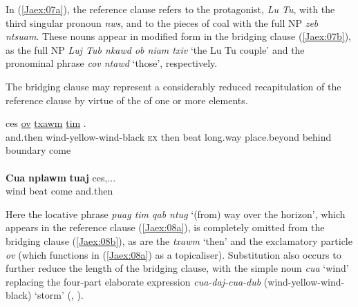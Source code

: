 \documentclass[output=paper]{LSP/langsci}
\begin{document}
\noindent
In (\ref{Jaex:07a}), the reference clause refers to the protagonist, \textit{Lu Tu}, with the third singular pronoun \textit{nws}, and to the pieces of coal with the full NP \textit{zeb ntsuam}. These nouns appear in modified form in the bridging clause (\ref{Jaex:07b}), as the full NP \textit{Luj Tub nkawd ob niam txiv } `the Lu Tu couple' and the pronominal phrase \textit{cov ntawd } `those', respectively. 


The bridging clause may represent a considerably reduced recapitulation of the reference clause by virtue of the  of one or more elements.

%
\begin{exe}
\ex \label{Jaex:08ab}
\begin{xlist}
\ex \label{Jaex:08a}
\gll ces  \underline{} \underline{ov} \underline{txawm} \underline{} \underline{} \underline{tim} \underline{} \underline{} \underline{}.\\
and.then wind-yellow-wind-black \textsc{ex} then beat long.way place.beyond behind boundary come \\
\glt {}\\
\ex \label{Jaex:08b}
\gll \textbf{Cua}  \textbf{nplawm}  \textbf{tuaj} ces,...\\     	      
     wind  beat   come  and.then\\
\glt {} \citep[][4]{johnson92}
\end{xlist}
\end{exe}

\noindent
Here the locative phrase \textit{puag tim qab ntug } `(from) way over the horizon', which appears in the reference clause (\ref{Jaex:08a}), is completely omitted from the bridging clause (\ref{Jaex:08b}), as are the   \textit{txawm } `then' and the exclamatory particle \textit{ov} (which functions in (\ref{Jaex:08a}) as a topicaliser). Substitution also occurs to further reduce the length of the bridging clause, with the simple noun \textit{cua} `wind' replacing the four-part elaborate expression \textit{cua-daj-cua-dub }(wind-yellow-wind-black) `storm' (\citealt[][233--237]{jarkey15}, \citealt{johns82,mortensen03}).


\end{document}
